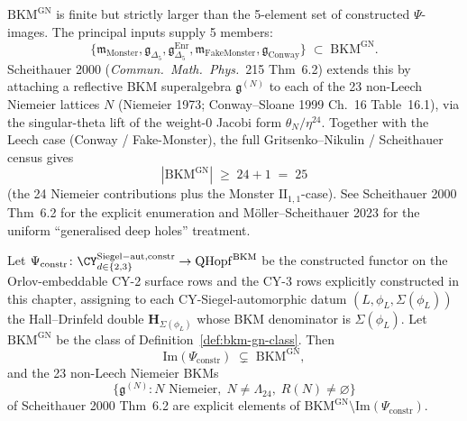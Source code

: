 \begin{remark}
\label{rem:bkm-gn-cardinality}
$\mathrm{BKM}^{\mathrm{GN}}$ is finite but strictly larger than the 5-element set of constructed $\Psi$-images. The principal inputs supply 5 members:
\[
 \{\mathfrak{m}_{\mathrm{Monster}}, \mathfrak{g}_{\Delta_5}, \mathfrak{g}_{\Delta_5}^{\mathrm{Enr}}, \mathfrak{m}_{\mathrm{FakeMonster}}, \mathfrak{g}_{\mathrm{Conway}}\} \;\subset\; \mathrm{BKM}^{\mathrm{GN}}.
\]
Scheithauer 2000 (\emph{Commun.\ Math.\ Phys.}~215 Thm~6.2) extends this by attaching a reflective BKM superalgebra $\mathfrak{g}^{(N)}$ to each of the 23 non-Leech Niemeier lattices $N$ (Niemeier 1973; Conway--Sloane 1999 Ch.~16 Table~16.1), via the singular-theta lift of the weight-$0$ Jacobi form $\theta_N / \eta^{24}$. Together with the Leech case (Conway / Fake-Monster), the full Gritsenko--Nikulin / Scheithauer census gives
\[
 |\mathrm{BKM}^{\mathrm{GN}}| \;\geq\; 24 + 1 \;=\; 25
\]
(the 24 Niemeier contributions plus the Monster $\mathrm{II}_{1,1}$-case). See Scheithauer 2000 Thm~6.2 for the explicit enumeration and Möller--Scheithauer 2023 for the uniform ``generalised deep holes'' treatment.
\end{remark}

\begin{theorem}
\label{thm:psi-nonsurjective-gn}
Let $\Psi_{\mathrm{constr}} \colon \CY^{\mathrm{Siegel-aut,constr}}_{d \in \{2,3\}} \to \mathrm{QHopf}^{\mathrm{BKM}}$ be the constructed functor on the Orlov-embeddable CY-2 surface rows and the CY-3 rows explicitly constructed in this chapter, assigning to each CY-Siegel-automorphic datum $(L, \phi_L, \Sigma(\phi_L))$ the Hall--Drinfeld double $\mathbf H_{\Sigma(\phi_L)}$ whose BKM denominator is $\Sigma(\phi_L)$. Let $\mathrm{BKM}^{\mathrm{GN}}$ be the class of Definition~\textup{\ref{def:bkm-gn-class}}. Then
\[
 \mathrm{Im}(\Psi_{\mathrm{constr}}) \;\subsetneq\; \mathrm{BKM}^{\mathrm{GN}},
\]
and the 23 non-Leech Niemeier BKMs
\[
 \bigl\{\mathfrak{g}^{(N)} : N \text{ Niemeier},\; N \neq \Lambda_{24},\; R(N) \neq \varnothing \bigr\}
\]
of Scheithauer 2000 Thm~6.2 are explicit elements of $\mathrm{BKM}^{\mathrm{GN}} \setminus \mathrm{Im}(\Psi_{\mathrm{constr}})$.
\end{theorem}

